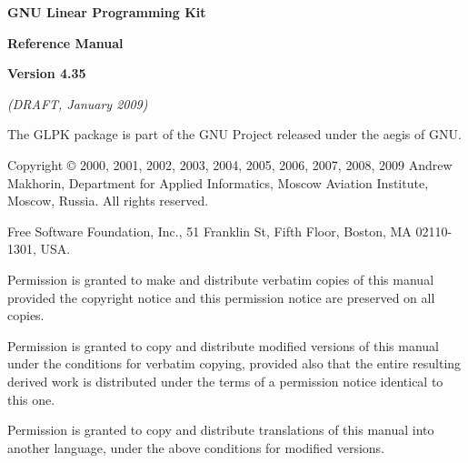 \documentclass[dvipdfm,11pt]{report}
\begin{document}
\thispagestyle{empty}

\begin{center}

\vspace*{1in}

\begin{huge}
\bf GNU Linear Programming Kit
\end{huge}

\vspace{0.5in}

\begin{LARGE}
\bf Reference Manual
\end{LARGE}

\vspace{0.5in}

\begin{LARGE}
\bf Version 4.35
\end{LARGE}

\vspace{0.5in}
\begin{Large}
\it(DRAFT, January 2009)
\end{Large}
\end{center}

\newpage

\vspace*{1in}

\vfill

\noindent
The GLPK package is part of the GNU Project released under the aegis of
GNU.

\medskip \noindent
Copyright \copyright{} 2000, 2001, 2002, 2003, 2004, 2005, 2006, 2007,
2008, 2009 Andrew Makhorin, Department for Applied Informatics, Moscow
Aviation Institute, Moscow, Russia. All rights reserved.

\medskip \noindent
Free Software Foundation, Inc., 51 Franklin St, Fifth Floor, Boston, MA
02110-1301, USA.

\medskip \noindent
Permission is granted to make and distribute verbatim copies of this
manual provided the copyright notice and this permission notice are
preserved on all copies.

\medskip \noindent
Permission is granted to copy and distribute modified versions of this
manual under the conditions for verbatim copying, provided also that the
entire resulting derived work is distributed under the terms of
a permission notice identical to this one.

\medskip \noindent
Permission is granted to copy and distribute translations of this manual
into another language, under the above conditions for modified versions.

\tableofcontents













\appendix










\end{document}
